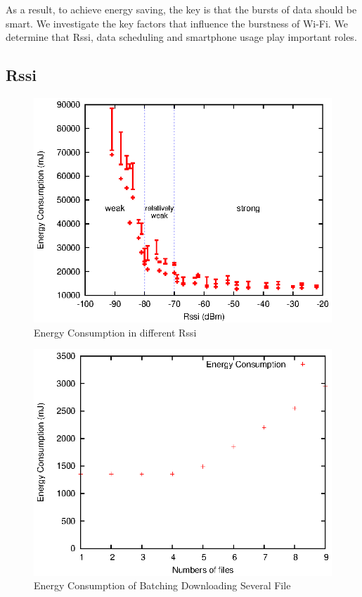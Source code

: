 \documentclass[journal]{IEEEtran}
\begin{document}
As a result, to achieve energy saving, the key is that the bursts of data should be smart.
We investigate the key factors that influence the burstness of Wi-Fi. 
We determine that Rssi, data scheduling and smartphone usage play important roles.
\subsection{Rssi}

\begin{figure}
\centering
\includegraphics[scale=0.95]{rssi_energy.eps}
\caption{Energy Consumption in different Rssi}
\label{rssi_energy}
\end{figure}

\begin{figure}
\centering
\includegraphics[scale=0.95]{energy_number_of_downloads_orderof_400KB.eps}
\caption{Energy Consumption of Batching Downloading Several File}
\label{energy_number_of_downloads_orderof_400KB}
\end{figure}
\end{document}
